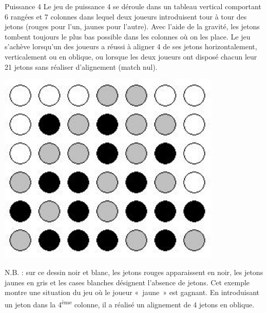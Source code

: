 \begin{Exercice}{Puissance 4}
	Le jeu de puissance 4 se déroule dans un tableau vertical comportant 6
	rangées et 7 colonnes dans lequel deux joueurs introduisent tour à tour
	des jetons (rouges pour l’un, jaunes pour l’autre). Avec l’aide de la
	gravité, les jetons tombent toujours le plus bas possible dans les
	colonnes où on les place. Le jeu s’achève lorsqu’un des joueurs a
	réussi à aligner 4 de ses jetons horizontalement, verticalement ou en
	oblique, ou lorsque les deux joueurs ont disposé chacun leur 21 jetons
	sans réaliser d’alignement (match nul).


	
		\begin{minipage}[t][][b]{4cm}
		\includegraphics[width=0.8\textwidth]{image/puissance4}
		\end{minipage}
		\begin{minipage}[t][][b]{10cm}
		N.B. : sur ce dessin noir et
		blanc, les jetons rouges apparaissent en noir, les jetons jaunes en
		gris et les cases blanches désignent l'absence de
		jetons. Cet exemple montre une situation du jeu où le joueur «~jaune~»
		est gagnant. En introduisant un jeton dans la
		4\textsuperscript{ème} colonne,
		il a réalisé un alignement de 4 jetons en oblique.
		\end{minipage}


\end{Exercice}
